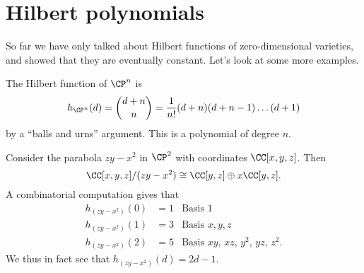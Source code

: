 \section{Hilbert polynomials}
So far we have only talked about Hilbert functions
of zero-dimensional varieties, and showed that
they are eventually constant.
Let's look at some more examples.
\begin{example}
	The Hilbert function of $\CP^n$ is
	\[ h_{\CP^n}(d) = \binom{d+n}{n}
	= \frac{1}{n!} (d+n)(d+n-1) \dots (d+1) \]
	by a ``balls and urns'' argument.
	This is a polynomial of degree $n$.
\end{example}
\begin{example}
	Consider the parabola $zy-x^2$ in $\CP^2$
	with coordinates $\CC[x,y,z]$.
	Then
	\[ \CC[x,y,z] / (zy-x^2) \cong \CC[y,z] \oplus x\CC[y,z]. \]
	A combinatorial computation gives that
	\begin{align*}
		h_{(zy-x^2)}(0) &= 1 & \text{Basis $1$} \\
		h_{(zy-x^2)}(1) &= 3 & \text{Basis $x,y,z$} \\
		h_{(zy-x^2)}(2) &= 5 & \text{Basis $xy$, $xz$, $y^2$, $yz$, $z^2$}.
	\end{align*}
	We thus in fact see that $h_{(zy-x^2)}(d) = 2d-1$.
\end{example}


